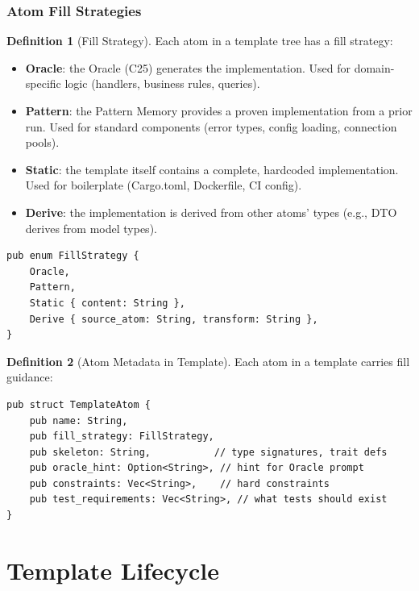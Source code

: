 \documentclass[11pt,a4paper,twoside]{article}
\theoremstyle{definition}
\newtheorem{definition}{Definition}[section]
\theoremstyle{plain}
\theoremstyle{remark}
\begin{document}
\section{Atom Fill Strategies}\label{sec:fill}

\begin{definition}[Fill Strategy]\label{def:fill}
Each atom in a template tree has a fill strategy:
\begin{itemize}[nosep]
  \item \textbf{Oracle}: the Oracle (C25) generates the
        implementation. Used for domain-specific logic (handlers,
        business rules, queries).
  \item \textbf{Pattern}: the Pattern Memory provides a proven
        implementation from a prior run. Used for standard
        components (error types, config loading, connection pools).
  \item \textbf{Static}: the template itself contains a complete,
        hardcoded implementation. Used for boilerplate (Cargo.toml,
        Dockerfile, CI config).
  \item \textbf{Derive}: the implementation is derived from other
        atoms' types (e.g., DTO derives from model types).
\end{itemize}
\begin{lstlisting}
pub enum FillStrategy {
    Oracle,
    Pattern,
    Static { content: String },
    Derive { source_atom: String, transform: String },
}
\end{lstlisting}
\end{definition}

\begin{definition}[Atom Metadata in Template]\label{def:atommeta}
Each atom in a template carries fill guidance:
\begin{lstlisting}
pub struct TemplateAtom {
    pub name: String,
    pub fill_strategy: FillStrategy,
    pub skeleton: String,           // type signatures, trait defs
    pub oracle_hint: Option<String>, // hint for Oracle prompt
    pub constraints: Vec<String>,    // hard constraints
    pub test_requirements: Vec<String>, // what tests should exist
}
\end{lstlisting}
\end{definition}


\part{Template Lifecycle}\label{part:lifecycle}
\end{document}
